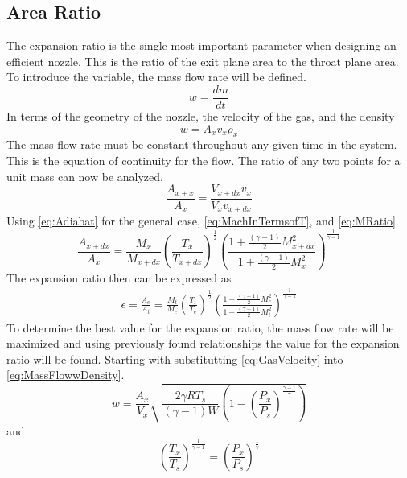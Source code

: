 \subsection{Area Ratio}
The expansion ratio is the single most important parameter when designing an efficient nozzle. This is the ratio of the exit plane area to the throat plane area. To introduce the variable, the mass flow rate will be defined.
\begin{equation}\label{eq:MassFlow}
w=\frac{dm}{dt}
\end{equation}
In terms of the geometry of the nozzle, the velocity of the gas, and the density
\begin{equation}
w=A_xv_x\rho_x
\end{equation}
The mass flow rate must be constant throughout any given time in the system. This is the equation of continuity for the flow. The ratio of any two points for a unit mass can now be analyzed,
\begin{equation}\label{eq:MassFlowwDensity}
\frac{A_{x+x}}{A_x}=\frac{V_{x+dx}v_x}{V_xv_{x+dx}}
\end{equation}
Using \ref{eq:Adiabat} for the general case, \ref{eq:MachInTermsofT}, and \ref{eq:MRatio}
\begin{equation}
\frac{A_{x+dx}}{A_x}=\frac{M_x}{M_{x+dx}}\left(\frac{T_x}{T_{x+dx}}\right)^\frac{1}{2}\left(\frac{1+\frac{(\gamma-1)}{2}M_{x+dx}^2}{1+\frac{(\gamma-1)}{2}M_x^2}\right)^{\frac{1}{\gamma-1}}
\end{equation}
The expansion ratio then can be expressed as
\begin{align}
\epsilon=\frac{A_e}{A_t}=\frac{M_t}{M_e}\left(\frac{T_t}{T_e}\right)^\frac{1}{2}\left(\frac{1+\frac{(\gamma-1)}{2}M_e^2}{1+\frac{(\gamma-1)}{2}M_t^2}\right)^{\frac{1}{\gamma-1}}
\end{align}%
To determine the best value for the expansion ratio, the mass flow rate will be maximized and using previously found relationships the value for the expansion ratio will be found. Starting with substitutting \ref{eq:GasVelocity} into \ref{eq:MassFlowwDensity}.
\begin{equation}\label{eq:WforAll}
w=\frac{A_x}{V_x}\sqrt{\frac{2\gamma RT_s}{(\gamma-1)W}\left(1-\left(\frac{P_x}{P_s}\right)^{\frac{\gamma-1}{\gamma}}\right)}
\end{equation}
and
\begin{equation}\label{eq:TtoP}
\left(\frac{T_x}{T_s}\right)^{\frac{1}{\gamma-1}}=\left(\frac{P_x}{P_s}\right)^{\frac{1}{\gamma}}
\end{equation}

